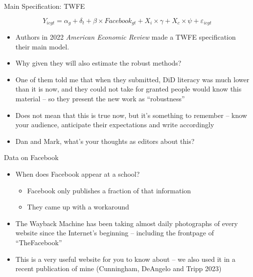 \documentclass{beamer}
\begin{document}
\begin{frame}{Main Specification: TWFE}

\begin{equation}
Y_{icgt} = \alpha_g + \delta_t + \beta \times Facebook_{gt} + X_i \times \gamma + X_c \times \psi + \varepsilon_{icgt}
\end{equation}

\bigskip

\begin{itemize}
\item Authors in 2022 \emph{American Economic Review} made a TWFE specification their main model. 
\item Why given they will also estimate the robust methods?  
\item One of them told me that when they submitted, DiD literacy was much lower than it is now, and they could not take for granted people would know this material -- so they present the new work as ``robustness''
\item Does not mean that this is true now, but it's something to remember -- know your audience, anticipate their expectations and write accordingly 
\item Dan and Mark, what's your thoughts as editors about this?
\end{itemize}

\end{frame}


\begin{frame}{Data on Facebook}

\begin{itemize}

\item When does Facebook appear at a school?  
	\begin{itemize}
	\item Facebook only publishes a fraction of that information
	\item They came up with a workaround
	\end{itemize}
\item The Wayback Machine has been taking almost daily photographs of every website since the Internet's beginning -- including the frontpage of ``TheFacebook''
\item This is a very useful website for you to know about -- we also used it in a recent publication of mine (Cunningham, DeAngelo and Tripp 2023)

\end{itemize}

\end{frame}
\end{document}
